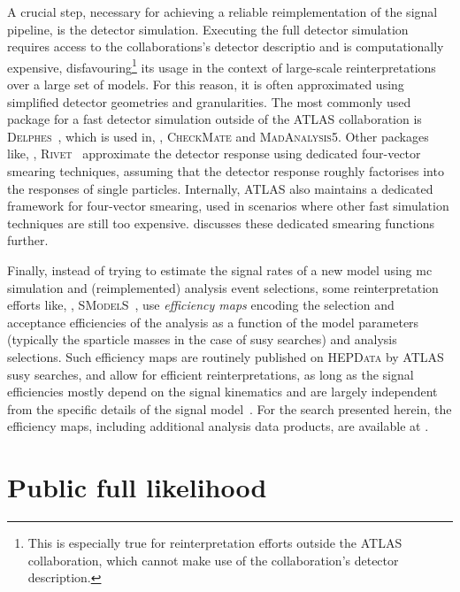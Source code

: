 A crucial step, necessary for achieving a reliable reimplementation of the signal pipeline, is the detector simulation.
Executing the full detector simulation requires access to the collaborations's detector descriptio and is computationally expensive, disfavouring\footnote{This is especially true for reinterpretation efforts outside the ATLAS collaboration, which cannot make use of the collaboration's detector description.} its usage in the context of large-scale reinterpretations over a large set of models.
For this reason, it is often approximated using simplified detector geometries and granularities.
The most commonly used package for a fast detector simulation outside of the ATLAS collaboration is \textsc{Delphes}~\cite{Delphes:2009tx}, which is used in, \eg, \textsc{CheckMate} and \textsc{MadAnalysis5}.
Other packages like, \eg, \textsc{Rivet}~\cite{Rivet1:2010ar,Rivet2:2019stt} approximate the detector response using dedicated four-vector smearing techniques, assuming that the detector response roughly factorises into the responses of single particles.
Internally, ATLAS also maintains a dedicated framework for four-vector smearing, used in scenarios where other fast simulation techniques are still too expensive.
 discusses these dedicated smearing functions further.

Finally, instead of trying to estimate the signal rates of a new model using \gls{mc} simulation and (reimplemented) analysis event selections, some reinterpretation efforts like, \eg, \textsc{SModelS}~\cite{SModelS1:2013mwa,SModelS2:2017neo}, use \textit{efficiency maps} encoding the selection and acceptance efficiencies of the analysis as a function of the model parameters (typically the sparticle masses in the case of \gls{susy} searches) and analysis selections.
Such efficiency maps are routinely published on \textsc{HEPData} by ATLAS \gls{susy} searches, and allow for efficient reinterpretations, as long as the signal efficiencies mostly depend on the signal kinematics and are largely independent from the specific details of the signal model~\cite{SModelS1:2013mwa}. For the \onelepton search presented herein, the efficiency maps, including additional analysis data products, are available at \cite{HEPdata_1Lbb}. 

\section{Public full likelihood}\label{sec:full_likelihood}

